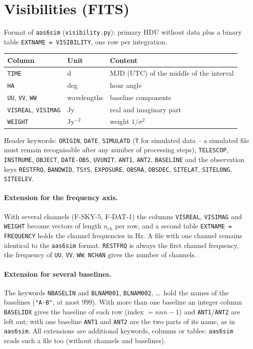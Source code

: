 \section{Visibilities (FITS)}

Format of \texttt{aas6sim} (\texttt{visibility.py}): primary HDU without
data plus a binary table \texttt{EXTNAME = VISIBILITY}, one row per
integration.
\begin{center}
\begin{tabular}{@{}lll@{}}
\toprule
Column & Unit & Content \\
\midrule
\texttt{TIME} & d & MJD (UTC) of the middle of the interval \\
\texttt{HA} & deg & hour angle \\
\texttt{UU}, \texttt{VV}, \texttt{WW} & wavelengths & baseline components \\
\texttt{VISREAL}, \texttt{VISIMAG} & Jy & real and imaginary part \\
\texttt{WEIGHT} & Jy$^{-2}$ & weight $1/\sigma^2$ \\
\bottomrule
\end{tabular}
\end{center}
Header keywords: \texttt{ORIGIN}, \texttt{DATE}, \texttt{SIMULATD}
(\texttt{T} for simulated data -- a simulated file must remain
recognisable after any number of processing steps), \texttt{TELESCOP},
\texttt{INSTRUME}, \texttt{OBJECT}, \texttt{DATE-OBS}, \texttt{UVUNIT},
\texttt{ANT1}, \texttt{ANT2}, \texttt{BASELINE} and the observation keys
\texttt{RESTFRQ}, \texttt{BANDWID}, \texttt{TSYS}, \texttt{EXPOSURE},
\texttt{OBSRA}, \texttt{OBSDEC}, \texttt{SITELAT}, \texttt{SITELONG},
\texttt{SITEELEV}.

\paragraph*{Extension for the frequency axis.} With several channels
(F-SKY-5, F-DAT-1) the columns \texttt{VISREAL}, \texttt{VISIMAG} and
\texttt{WEIGHT} become vectors of length $n_{ch}$ per row, and a
second table \texttt{EXTNAME = FREQUENCY} holds the channel
frequencies in Hz. A file with one channel remains identical to the
\texttt{aas6sim} format.
\texttt{RESTFRQ} is always the first channel frequency, the frequency of
\texttt{UU}, \texttt{VV}, \texttt{WW}; \texttt{NCHAN} gives the number of
channels.

\paragraph*{Extension for several baselines.} The keywords
\texttt{NBASELIN} and \texttt{BLNAM001}, \texttt{BLNAM002}, \dots\ hold
the names of the baselines (\texttt{"A-B"}, at most 999). With more than one
baseline an integer column \texttt{BASELIDX} gives the baseline of each row
(index $= nnn - 1$) and \texttt{ANT1}/\texttt{ANT2} are left out; with one
baseline \texttt{ANT1} and \texttt{ANT2} are the two parts of its name, as
in \texttt{aas6sim}. All extensions are additional keywords, columns or
tables: \texttt{aas6sim} reads such a file too (without channels and
baselines).

